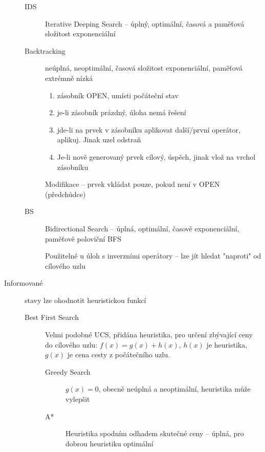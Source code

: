 \documentclass[a4paper, 11pt]{report}
\begin{document}
\begin{description}
\begin{description}
		\item[IDS] Iterative Deeping Search -- úplný, optimální, časová a paměťová složitost exponenciální
		
		\item[Backtracking] neúplná, neoptimální, časová složitost exponenciální, paměťová extrémně nízká
		\begin{enumerate}
			\item zásobník OPEN, umísti počáteční stav
			\item je-li zásobník prázdný, úloha nemá řešení
			\item jde-li na prvek v zásobníku aplikovat další/první operátor, aplikuj. Jinak uzel odstraň
			\item Je-li nově generovaný prvek cílový, úspěch, jinak vlož na vrchol zásobníku
		\end{enumerate}
		Modifikace -- prvek vkládat pouze, pokud není v OPEN (předchůdce)
		
		\item[BS] Bidirectional Search -- úplná, optimální, časově exponenciální, paměťově poloviční BFS
		
		Použitelné u úloh s inverzními operátory -- lze jít hledat "naproti" od cílového uzlu
	\end{description}
	\item[Informované] stavy lze ohodnotit heuristickou funkcí
	\begin{description}
		\item[Best First Search] Velmi podobné UCS, přidána heuristika, pro určení zbývající ceny do cílového uzlu: $f(x) = g(x) + h(x)$, $h(x)$ je heuristika, $g(x)$ je cena cesty z počátečního uzlu.
		
		\begin{description}
			\item[Greedy Search] $g(x) = 0$, obecně neúplná a neoptimální, heuristika může vylepšit
			
			\item[A*] Heuristika spodním odhadem skutečné ceny -- úplná, pro dobrou heuristiku optimální
			

\end{description}
\end{description}
\end{description}
\end{document}
